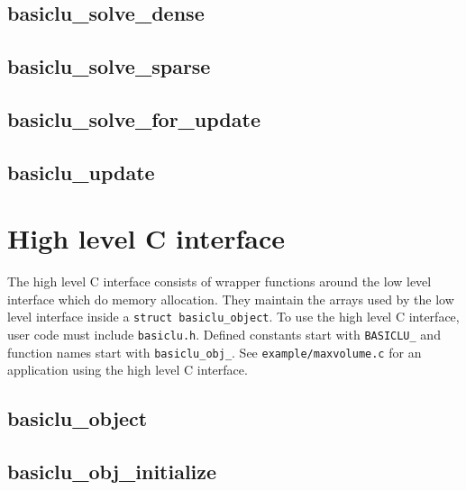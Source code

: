 \documentclass{article}
\newcommand{\ct}{\texttt}
\begin{document}
\newpage
\subsection{basiclu\_solve\_dense}
{\footnotesize

}

\newpage
\subsection{basiclu\_solve\_sparse}
{\footnotesize

}

\newpage
\subsection{basiclu\_solve\_for\_update}
{\footnotesize

}

\newpage
\subsection{basiclu\_update}
{\footnotesize

}
\newpage

\section{High level C interface}
The high level C interface consists of wrapper functions around the low level
interface which do memory allocation. They maintain the arrays used by the low
level interface inside a \ct{struct basiclu\_object}. To use the high level C
interface, user code must include \ct{basiclu.h}. Defined constants start with
\ct{BASICLU\_} and function names start with \ct{basiclu\_obj\_}. See
\ct{example/maxvolume.c} for an application using the high level C interface.

\newpage
\subsection{basiclu\_object}
{\footnotesize

}

\newpage
\subsection{basiclu\_obj\_initialize}
{\footnotesize

}
\end{document}
